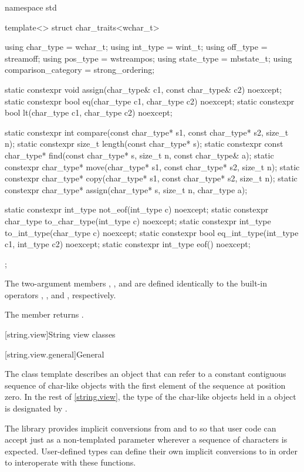 %
\begin{codeblock}
namespace std {
  template<> struct char_traits<wchar_t> {
    using char_type  = wchar_t;
    using int_type   = wint_t;
    using off_type   = streamoff;
    using pos_type   = wstreampos;
    using state_type = mbstate_t;
    using comparison_category = strong_ordering;

    static constexpr void assign(char_type& c1, const char_type& c2) noexcept;
    static constexpr bool eq(char_type c1, char_type c2) noexcept;
    static constexpr bool lt(char_type c1, char_type c2) noexcept;

    static constexpr int compare(const char_type* s1, const char_type* s2, size_t n);
    static constexpr size_t length(const char_type* s);
    static constexpr const char_type* find(const char_type* s, size_t n,
                                           const char_type& a);
    static constexpr char_type* move(char_type* s1, const char_type* s2, size_t n);
    static constexpr char_type* copy(char_type* s1, const char_type* s2, size_t n);
    static constexpr char_type* assign(char_type* s, size_t n, char_type a);

    static constexpr int_type not_eof(int_type c) noexcept;
    static constexpr char_type to_char_type(int_type c) noexcept;
    static constexpr int_type to_int_type(char_type c) noexcept;
    static constexpr bool eq_int_type(int_type c1, int_type c2) noexcept;
    static constexpr int_type eof() noexcept;
  };
}
\end{codeblock}


\pnum
The two-argument members
,
,
and
are defined identically
to the built-in operators
\tcode{=},
\tcode{==},
and
\tcode{<},
respectively.

\pnum
The member
returns
.

[string.view]{String view classes}

[string.view.general]{General}

\pnum
The class template  describes an object
that can refer to a constant contiguous sequence of char-like objects
with the first element of the sequence at position zero.
In the rest of \ref{string.view}, the type of the char-like objects
held in a  object is designated by .

\pnum
\begin{note}
The library provides implicit conversions from 
and  to 
so that user code can accept just 
as a non-templated parameter wherever a sequence of characters is expected.
User-defined types can define their own implicit conversions
to  in order to interoperate with these functions.
\end{note}

